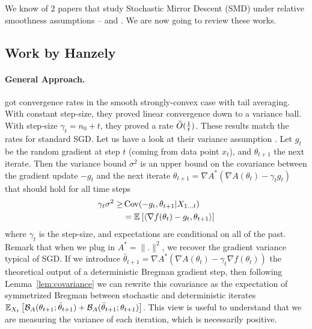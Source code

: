 \documentclass{article}
\newcommand*{\expect}[2][]{\ensuremath{\mathbb{E}_{#1} \left[ #2 \right] }} %
\newcommand{\logpart}{A}
\newcommand{\conj}{\logpart^*}
\newcommand{\bregman}{\cB_\logpart}
\newcommand{\nat}{\theta}
\newcommand{\lr}{\gamma} %
\begin{document}
We know of 2 papers that study Stochastic Mirror Descent (SMD) under relative smoothness assumptions -- \citet{hanzely2018fastest} and \citet{dragomir2021fast}. We are now going to review these works.

\subsection{Work by Hanzely}

\paragraph{General Approach.} 
\citet{hanzely2018fastest} got convergence rates in the smooth strongly-convex case with tail averaging. With constant step-size, they proved linear convergence down to a variance ball. With step-size $\gamma_t = n_0 + t$, they proved a rate $\tilde O(\frac{1}{t})$. These results match the rates for standard SGD.
Let us have a look at their variance assumption \citep[Assumption 5.1]{hanzely2018fastest}.
Let $g_t$ be the random gradient at step $t$  (coming from data point $x_t$), and $\nat_{t+1}$ the next iterate. Then the variance bound $\sigma^2$ is an upper bound on the covariance between the gradient update  $-g_t$ and the next iterate $\nat_{t+1} = \nabla \logpart^*(\nabla \logpart(\nat_t) - \lr_t g_t )$ that should hold for all time steps  
\begin{align}
	\lr_t \sigma^2 \geq 
	&\Cov(- g_t,\nat_{t+1} | X_{1 \dots t})  \label{eq:hanzely_hypothesis} \\
	 &= \expect{\langle \nabla f(\nat_t) - g_t , \nat_{t+1}  \rangle}
\end{align}
where $\gamma_t$ is the step-size, and expectations are conditional on all of the past. 
Remark that when we plug in $\conj = \|.\|^2$, we recover the gradient variance typical of SGD. 
If we introduce $\bar \nat_{t+1}=\nabla \logpart^*(\nabla \logpart(\nat_t) - \lr_t  \nabla f(\nat_t) )$ the theoretical output of a deterministic Bregman gradient step, then following Lemma~\ref{lem:covariance} we can rewrite this covariance as the expectation of symmetrized Bregman between stochastic and deterministic iterates $\expect[X_t]{\bregman(\nat_{t+1} ; \bar \nat_{t+1} ) + \bregman(\bar \nat_{t+1} ; \nat_{t+1} ) }$.
This view is useful to understand that we are measuring the variance of each iteration, which is necessarily positive.
\end{document}
